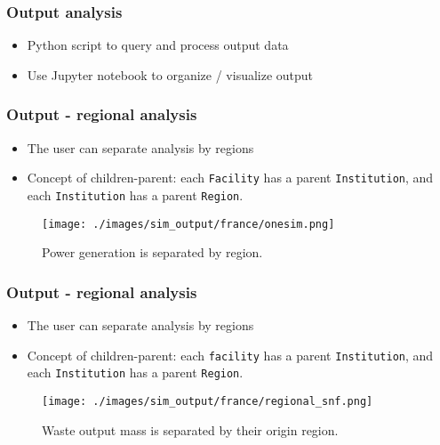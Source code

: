 \begin{frame}
    \frametitle{Output analysis}
    \begin{itemize}
        \item Python script to query and process output data
        \item Use Jupyter notebook to organize / visualize output
    \end{itemize}

\end{frame}

\begin{frame}
    \frametitle{Output - regional analysis}
    \begin{itemize}
        \item The user can separate analysis by regions
        \item Concept of children-parent: each \texttt{Facility} has a parent \texttt{Institution}, and each \texttt{Institution} has a parent \texttt{Region}.
    \end{itemize}
    \begin{figure}[htbp!]
        \begin{center}
                \texttt{[image: ./images/sim\_output/france/onesim.png]}
        \end{center}
    \caption{Power generation is separated by region.}
    \end{figure}
\end{frame}

\begin{frame}
    \frametitle{Output - regional analysis}
    \begin{itemize}
        \item The user can separate analysis by regions
        \item Concept of children-parent: each \texttt{facility} has a parent \texttt{Institution}, and each \texttt{Institution} has a parent \texttt{Region}.
    \end{itemize}
    \begin{figure}[htbp!]
        \begin{center}
                \texttt{[image: ./images/sim\_output/france/regional\_snf.png]}
        \end{center}
    \caption{Waste output mass is separated by their origin region.}
    \end{figure}
\end{frame}

